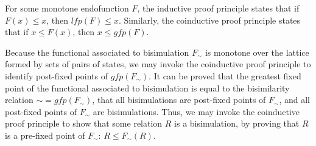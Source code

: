 For some monotone endofunction $F$, the inductive proof principle states that 
if $F(x) \leq x$, then $\mathit{lfp}(F) \leq x$. Similarly, the coinductive proof 
principle states that if $x \leq F(x)$, then $x \leq \mathit{gfp}(F)$. 

Because the functional associated to bisimulation $F_\sim$ is monotone over 
the lattice formed by sets of pairs of states, we may invoke the coinductive proof principle
to identify post-fixed points of $\mathit{gfp}(F_\sim)$. It can be proved that
the greatest fixed point of the functional associated to 
bisimulation is equal to the bisimilarity relation $\sim = \mathit{gfp}(F_\sim)$, that 
all bisimulations are 
post-fixed points of $F_\sim$, and all post-fixed points of $F_\sim$ are 
bisimulations. Thus, we may invoke the coinductive proof principle to show that some
 relation $R$ is a bisimulation, by proving that $R$ is a pre-fixed point of $F_\sim$: $R \leq F_\sim(R)$.
 

